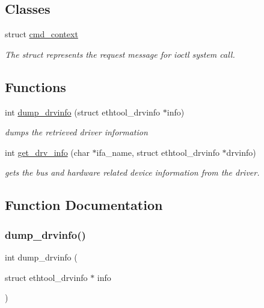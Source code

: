 \subsection*{Classes}
\begin{DoxyCompactItemize}
\item 
struct \hyperlink{structcmd__context}{cmd\+\_\+context}
\begin{DoxyCompactList}\small\item\em The struct represents the request message for ioctl system call. \end{DoxyCompactList}\end{DoxyCompactItemize}
\subsection*{Functions}
\begin{DoxyCompactItemize}
\item 
int \hyperlink{ethtool-info_8h_a972c7feb6f25da37144ec7933d787147}{dump\+\_\+drvinfo} (struct ethtool\+\_\+drvinfo $\ast$info)
\begin{DoxyCompactList}\small\item\em dumps the retrieved driver information \end{DoxyCompactList}\item 
int \hyperlink{ethtool-info_8h_af4d8c485fa8cc199f6e1f27e949c9dc4}{get\+\_\+drv\+\_\+info} (char $\ast$ifa\+\_\+name, struct ethtool\+\_\+drvinfo $\ast$drvinfo)
\begin{DoxyCompactList}\small\item\em gets the bus and hardware related device information from the driver. \end{DoxyCompactList}\end{DoxyCompactItemize}


\subsection{Function Documentation}
\mbox{\label{ethtool-info_8h_a972c7feb6f25da37144ec7933d787147}} 
\subsubsection{\texorpdfstring{dump\+\_\+drvinfo()}{dump\_drvinfo()}}
{\footnotesize\ttfamily int dump\+\_\+drvinfo (\begin{DoxyParamCaption}\item[{struct ethtool\+\_\+drvinfo $\ast$}]{info }\end{DoxyParamCaption})}



